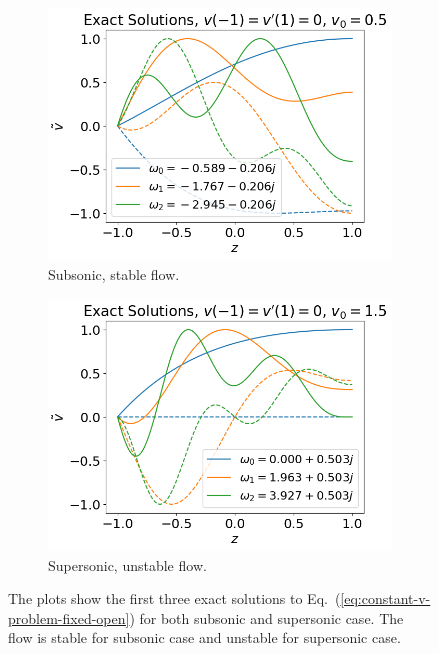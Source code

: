\begin{figure}[htbp]
	\centering
	\begin{subfigure}{0.5\textwidth}
		\includegraphics[width=\linewidth]{figures/exact-fixed-open-v0=0.5}
		\caption{Subsonic, stable flow.}
	\end{subfigure}%
	\begin{subfigure}{0.5\textwidth}
		\includegraphics[width=\linewidth]{figures/exact-fixed-open-v0=1.5}
		\caption{Supersonic, unstable flow.}
	\end{subfigure}
	\caption{The plots show the first three exact solutions to Eq.~(\ref{eq:constant-v-problem-fixed-open}) for both subsonic and supersonic case. The flow is stable for subsonic case and unstable for supersonic case.}
	\label{fig:exact-v-fixed-open}
\end{figure}
